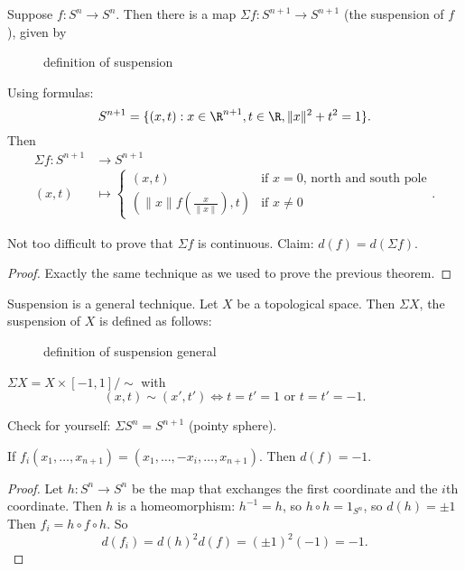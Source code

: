 Suppose $f: S^{n} \to  S^{n}$.
Then there is a map $\Sigma f: S^{n+1} \to  S^{n+1}$ (the suspension of $f$), given by

\begin{figure}[H]
    \centering
    \caption{definition of suspension}
    \label{fig:definition-of-suspension}
\end{figure}

Using formulas: 
\[
    S^{n+1} = \{(x, t) : x \in \R^{n+1}, t \in \R, \|x\|^2 + t^2 = 1\} 
.\] 
Then 
\begin{align*}
    \Sigma f: S^{n+1} &\longrightarrow S^{n+1} \\
    (x, t) &\longmapsto \begin{cases}
        (x, t) & \text{if $x = 0$, north and south pole}\\
        \left(\|x\| f(\frac{x}{\|x\|}), t\right) & \text{if $x \neq 0$}
    \end{cases}
.\end{align*}

Not too difficult to prove that $\Sigma f$ is continuous.
Claim:  $d(f) = d(\Sigma f)$.
\begin{proof}
    Exactly the same technique as we used to prove the previous theorem.
\end{proof}

\begin{remark}
    Suspension is a general technique.
    Let $X$ be a topological space.
    Then $\Sigma X$, the suspension of $X$ is defined as follows:

\begin{figure}[H]
    \centering
    \caption{definition of suspension general}
    \label{fig:definition-of-suspension-general}
\end{figure}

$\Sigma X = X \times [-1, 1] / \sim $ with
\[
    (x, t) \sim  (x', t') \iff t = t' = 1 \text{ or } t = t' = -1
.\] 

Check for yourself: $\Sigma S^{n} = S^{n+1}$ (pointy sphere).
\end{remark}

\begin{corollary}
    If $f_{i}(x_1, \ldots, x_{n+1}) = (x_1, \ldots, -x_i, \ldots, x_{n+1})$.
    Then $d(f) = -1$.
\end{corollary}
\begin{proof}
    Let $h: S^{n} \to  S^{n}$ be the map that exchanges the first coordinate and the $i$th coordinate.
    Then $h$ is a homeomorphism: $h^{-1} = h$, so $h  \circ  h = 1_{S^{n}}$, so $d(h) = \pm 1$
    Then $ f_i = h  \circ  f  \circ  h .$ 
    So
    \[
        d(f_i) = d(h)^2 d(f) = (\pm 1)^2 (-1) = -1
    .\] 
\end{proof}

